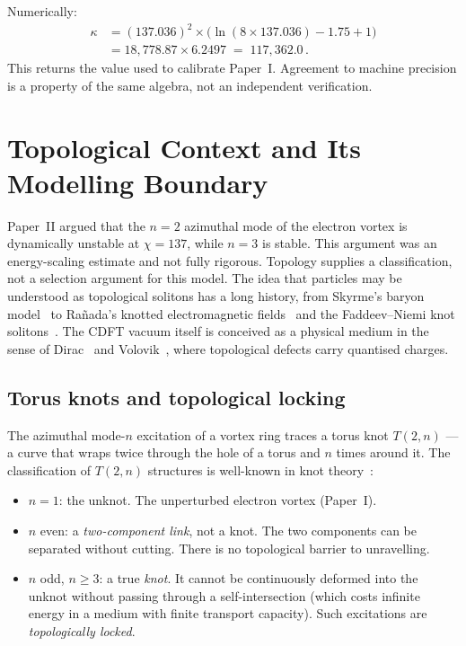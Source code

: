 \documentclass[11pt]{article}
\begin{document}
Numerically:
\begin{align}
  \kappa &= (137.036)^2 \times \bigl(\ln(8 \times 137.036) - 1.75 + 1\bigr)
  \nonumber \\
         &= 18{,}778.87 \times 6.2497 \;=\; 117{,}362.0\,.
  \label{eq:kappa_numerical}
\end{align}
This returns the value used to calibrate Paper~I. Agreement to machine precision
is a property of the same algebra, not an independent verification.


\section{Topological Context and Its Modelling Boundary}
\label{sec:topology}

Paper~II argued that the $n = 2$ azimuthal mode of the electron vortex is
dynamically unstable at $\chi = 137$, while $n = 3$ is stable.
This argument was an energy-scaling estimate and not fully rigorous.
Topology supplies a classification, not a selection argument for this model.
The idea that particles may be understood as topological solitons has
a long history, from Skyrme's baryon model~\cite{Skyrme1961} to
Ra\~{n}ada's knotted electromagnetic fields~\cite{Ranada1989}
and the Faddeev--Niemi knot solitons~\cite{FaddeevNiemi1997}.
The CDFT vacuum itself is conceived as a physical medium in the sense
of Dirac~\cite{Dirac1951} and Volovik~\cite{Volovik2003}, where
topological defects carry quantised charges.

\subsection{Torus knots and topological locking}

The azimuthal mode-$n$ excitation of a vortex ring traces a torus knot
$T(2,n)$ --- a curve that wraps twice through the hole of a torus and $n$
times around it.
The classification of $T(2,n)$ structures is well-known in knot theory~\cite{Rolfsen1976}:

\begin{itemize}
  \item $n = 1$: the unknot. The unperturbed electron vortex (Paper~I).
  \item $n$ even: a \emph{two-component link}, not a knot. The two components
    can be separated without cutting. There is no topological barrier to
    unravelling.
  \item $n$ odd, $n \geq 3$: a true \emph{knot}. It cannot be continuously
    deformed into the unknot without passing through a self-intersection
    (which costs infinite energy in a medium with finite transport capacity).
    Such excitations are \emph{topologically locked}.
\end{itemize}
\end{document}
